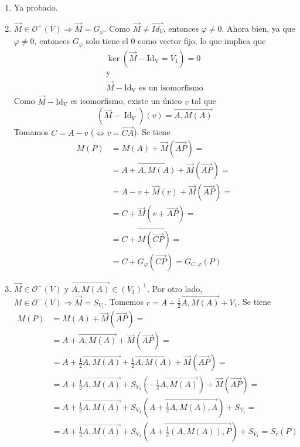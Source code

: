 \documentclass[12pt, a4paper, ones, notitlepage, openany,titlepage]{article}
\begin{document}
\begin{enumerate}[label=(\arabic*)]
	\item Ya probado.
	\item $\overrightarrow{M} \in \mathcal{O}^+(V) \Longrightarrow \overrightarrow{M} = G_\varphi$. Como $\overrightarrow{M} \neq \overrightarrow{Id_V}$, entonces $\varphi \neq 0$. Ahora bien, ya que $\varphi \neq 0$, entonces $G_\varphi$ solo tiene el $0$ como vector fijo, lo que implica que
	$$
	\begin{array}{c}
		\ker(\overrightarrow{M} - \operatorname{Id_V} = V_1) = 0 \\
		\text{y} \\
		\overrightarrow{M} - \operatorname{Id_V} \text{ es un isomorfismo}
	\end{array}
	$$
	Como $\overrightarrow{M} - \operatorname{Id_V}$ es isomorfismo, existe un único $v$ tal que
	$$
	(\overrightarrow{M} - \operatorname{Id}_V)(v) = \overrightarrow{A,M(A)}
	$$
	Tomamos $C = A - v$ ($\Longleftrightarrow v = \overrightarrow{CA}$). Se tiene
	$$
	\begin{aligned}
		M(P) & = M(A) + \overrightarrow{M}(\overrightarrow{AP}) = \\
		& = A + \overrightarrow{A,M(A)} + \overrightarrow{M}(\overrightarrow{AP}) = \\
		& = A - v + \overrightarrow{M}(v) + \overrightarrow{M}(\overrightarrow{AP}) = \\
		& = C + \overrightarrow{M}(v + \overrightarrow{AP}) = \\
		& = C + \overrightarrow{M(\overrightarrow{CP})} = \\
		& = C + G_\varphi(\overrightarrow{CP}) = G_{C,\varphi}(P)
	\end{aligned}
	$$
	
	\item $\overrightarrow{M} \in \mathcal{O}^-(V)$ y $\overrightarrow{A,M(A)} \in (V_1)^\perp$. Por otro lado, $M \in \mathcal{O}^-(V) \Longrightarrow \overrightarrow{M} = S_{V_1}$. Tomemos $r = A + \frac{1}{2}\overrightarrow{A,M(A)} + V_1$. Se tiene
	$$
	\begin{aligned}
		M(P) & = M(A) + \overrightarrow{M}(\overrightarrow{AP}) = \\
		& = A + \overrightarrow{A,M(A)} + \overrightarrow{M}(\overrightarrow{AP}) = \\
		& = A + \frac{1}{2}\overrightarrow{A,M(A)} + \frac{1}{2}\overrightarrow{A,M(A)} + \overrightarrow{M}(\overrightarrow{AP}) = \\
		& = A + \frac{1}{2}\overrightarrow{A,M(A)} + S_{V_1}\left(-\frac{1}{2}\overrightarrow{A,M(A)}\right) + \overrightarrow{M}(\overrightarrow{AP}) = \\
		& = A + \frac{1}{2}\overrightarrow{A,M(A)} + S_{V_1}\left(\overrightarrow{A + \frac{1}{2} A,M(A),A}\right) + S_{V_1} = \\
		& = A + \frac{1}{2}\overrightarrow{A,M(A)} + S_{V_1}\left(\overrightarrow{A + \frac{1}{2}(A,M(A)),P}\right) + S_{V_1} = S_r(P)
	\end{aligned}
	$$
	

\end{enumerate}
\end{document}
